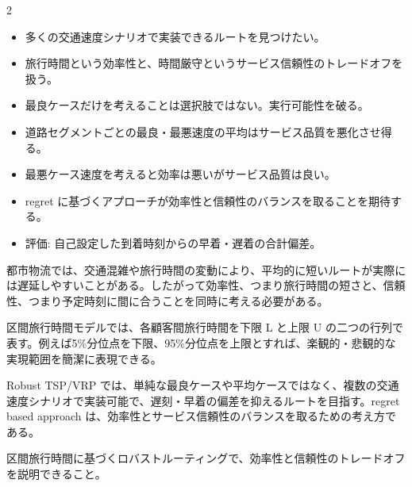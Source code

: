 \clearpage



\vspace{1.5mm}

\begin{multicols}{2}

\footnotesize

\raggedcolumns


\begin{itemize}
\item 多くの交通速度シナリオで実装できるルートを見つけたい。
\item 旅行時間という効率性と、時間厳守というサービス信頼性のトレードオフを扱う。
\item 最良ケースだけを考えることは選択肢ではない。実行可能性を破る。
\item 道路セグメントごとの最良・最悪速度の平均はサービス品質を悪化させ得る。
\item 最悪ケース速度を考えると効率は悪いがサービス品質は良い。
\item regret に基づくアプローチが効率性と信頼性のバランスを取ることを期待する。
\item 評価: 自己設定した到着時刻からの早着・遅着の合計偏差。
\end{itemize}

都市物流では、交通混雑や旅行時間の変動により、平均的に短いルートが実際には遅延しやすいことがある。したがって効率性、つまり旅行時間の短さと、信頼性、つまり予定時刻に間に合うことを同時に考える必要がある。\par

区間旅行時間モデルでは、各顧客間旅行時間を下限 L と上限 U の二つの行列で表す。例えば5\%分位点を下限、95\%分位点を上限とすれば、楽観的・悲観的な実現範囲を簡潔に表現できる。\par

Robust TSP/VRP では、単純な最良ケースや平均ケースではなく、複数の交通速度シナリオで実装可能で、遅刻・早着の偏差を抑えるルートを目指す。regret based approach は、効率性とサービス信頼性のバランスを取るための考え方である。\par

区間旅行時間に基づくロバストルーティングで、効率性と信頼性のトレードオフを説明できること。\par


\end{multicols}
